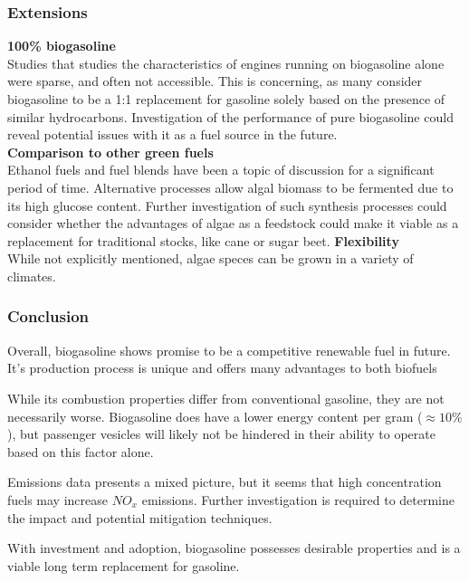 \documentclass[10pt,a4paper]{article}
\begin{document}
\subsubsection{Extensions}
\textbf{100\% biogasoline}\\
Studies that studies the characteristics of engines running on biogasoline alone were sparse, and often not accessible. This is concerning, as many consider biogasoline to be a 1:1 replacement for gasoline solely based on the presence of similar hydrocarbons. Investigation of the performance of pure biogasoline could reveal potential issues with it as a fuel source in the future. \\
\textbf{Comparison to other \textquotesingle{}green\textquotesingle{} fuels}\\
Ethanol fuels and fuel blends have been a topic of discussion for a significant period of time. Alternative processes allow algal biomass to be fermented due to its high glucose content. Further investigation of such synthesis processes could consider whether the advantages of algae as a feedstock could make it viable as a replacement for traditional stocks, like cane or sugar beet.
\textbf{Flexibility}\\
While not explicitly mentioned, algae speces can be grown in a variety of climates.
	\subsubsection{Conclusion}\label{conclusion} 
	Overall, biogasoline shows promise to be a competitive renewable fuel in future. It's production process is unique and offers many advantages to both biofuels 
	
	While its combustion properties differ from conventional gasoline, they are not necessarily worse. Biogasoline does have a lower energy content per gram ($\approx 10\%$), but passenger vesicles will likely not be hindered in their ability to operate based on this factor alone.
	
	Emissions data presents a mixed picture, but it seems that high concentration fuels may increase $NO_x$ emissions. Further investigation is required to determine the impact and potential mitigation techniques. 
	
	With investment and adoption, biogasoline possesses desirable properties and is a viable long term replacement for gasoline. 
	
	\newpage

	
	
	\nocite{*}
\end{document}
